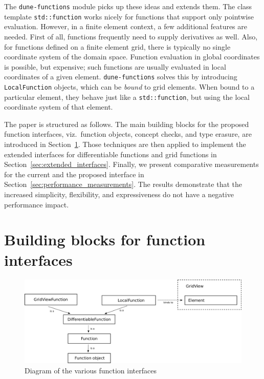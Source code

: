 \documentclass[11pt,
                 numbers=noenddot,
                 headings=normal,
                 DIV16, BCOR10mm]{scrartcl}
\newcommand{\cpp}{\lstinline}
\theoremstyle{remark}
\newcommand{\dunemodule}[1]{\texttt{#1}}
\begin{document}
The \dunemodule{dune-functions} module \cite{DuneFunctions} picks up these ideas and extends them. The class template
\cpp{std::function}
works nicely for functions that support only pointwise evaluation.  However, in a finite element context, a few
additional features are needed.  First of all, functions frequently need to supply derivatives as well.
Also, for functions defined on a finite element grid, there is typically no single coordinate system of the domain
space.  Function evaluation in global coordinates is possible, but expensive; such functions are usually evaluated
in local coordinates of a given element.  \dunemodule{dune-functions} solves this by introducing \cpp{LocalFunction}
objects, which can be {\em bound} to grid elements.  When bound to a particular element, they behave just like a
\cpp{std::function}, but using the local coordinate system of that element.

The paper is structured as follows.
The main building blocks for the proposed function interfaces, viz.\
function objects, concept checks, and type erasure,
are introduced in Section~\ref{sec:interfaces}.
Those techniques are then applied
to implement the extended interfaces
for differentiable functions and grid functions
in Section~\ref{sec:extended_interfaces}. Finally,
we present comparative measurements for the current
and the proposed interface in Section~\ref{sec:performance_measurements}.
The results demonstrate that the increased simplicity, flexibility,
and expressiveness do not have a negative
performance impact.



\section{Building blocks for function interfaces}
\label{sec:interfaces}


\begin{figure}
 \begin{center}
  \includegraphics[width=\textwidth]{functions_interface_schematic}
 \end{center}

 \caption{Diagram of the various function interfaces}
 \label{fig:function_interface_hierarchy}
\end{figure}
\end{document}
